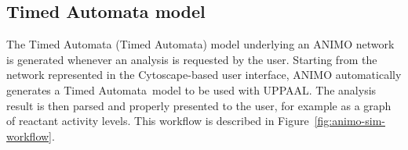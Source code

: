 \documentclass{bmcart}
\def\tas{Timed Automata}
\begin{document}
% 
% 
% 
% 




\subsection*{Timed Automata model}
The Timed Automata (\tas) model underlying an ANIMO network is generated whenever an analysis is requested by the user.
Starting from the network represented in the Cytoscape-based user interface, ANIMO automatically generates a \tas\ model
to be used with UPPAAL. The analysis result is then parsed and properly presented to the user, for example
as a graph of reactant activity levels. This workflow is described in Figure~\ref{fig:animo-sim-workflow}.
\end{document}
